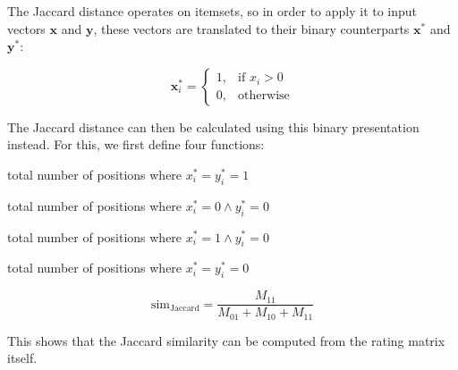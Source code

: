 The Jaccard distance operates on itemsets, so in order to apply it to input vectors $\bm{x}$ and $\bm{y}$, these vectors are translated to their binary counterparts $\bm{x}^{*}$ and $\bm{y}^{*}$:

\begin{equation}
	\bm{x}^{*}_{i} =
	\begin{cases}
	    1,& \text{if } x_i > 0 \\
	    0,& \text{otherwise}
	\end{cases}
\end{equation}

The Jaccard distance can then be calculated using this binary presentation instead.
For this, we first define four functions:

\begin{description}
	\setlength\itemsep{0em}
	\item [$M_{11}$] total number of positions where $x_i^{*}=y_i^*=1$
	\item [$M_{01}$] total number of positions where $x_i^*=0 \land y_i^*=0$
	\item [$M_{10}$] total number of positions where $x_i^*=1 \land y_i^*=0$
	\item [$M_{00}$] total number of positions where $x_i^*=y_i^*=0$
\end{description}

\begin{equation}
	\mathrm{sim}_{\mathrm{Jaccard}}=\frac{M_{11}}{M_{01} + M_{10} + M_{11}}
\end{equation}

This shows that the Jaccard similarity can be computed from the rating matrix itself.


